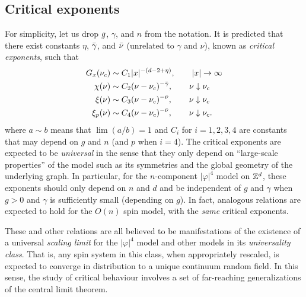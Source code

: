 \subsection{Critical exponents}

For simplicity, let us drop $g$, $\gamma$, and $n$ from the notation.
It is predicted that there exist constants $\eta$, $\bar\gamma$, and $\bar\nu$
(unrelated to $\gamma$ and $\nu$), known as \emph{critical exponents}, such that
\begin{align}
G_x(\nu_c)
	&\sim
C_1 |x|^{-(d - 2 + \eta)},
	\qquad
|x|\rightarrow\infty \\
\chi(\nu)
	&\sim
C_2 (\nu - \nu_c)^{-\bar\gamma},
	\qquad
\nu\downarrow\nu_c \\
\xi(\nu)
	&\sim
C_3 (\nu - \nu_c)^{-\bar\nu},
	\qquad
\nu\downarrow\nu_c \\
\xi_p(\nu)
	&\sim
C_4 (\nu - \nu_c)^{-\bar\nu},
	\qquad
\nu\downarrow\nu_c.
\end{align}
where $a \sim b$ means that $\lim (a/b) = 1$ and $C_i$ for $i = 1,2,3,4$
are constants that may depend on $g$ and $n$ (and $p$ when $i = 4$).
The critical exponents are expected to be \emph{universal} in the sense that they
only depend on ``large-scale properties'' of the model such as its symmetries and
the global geometry of the underlying graph. In particular,
for the $n$-component $|\varphi|^4$ model on ${ {{\mathbb Z}}^d }$, these exponents should only
depend on $n$ and $d$ and be independent of $g$ and $\gamma$ when $g > 0$ and $\gamma$
is sufficiently small (depending on $g$). In fact,
analogous relations are expected to hold for the $O(n)$ spin model, with the
\emph{same} critical exponents.

These and other relations are all believed to be manifestations of the existence of
a universal \emph{scaling limit} for the $|\varphi|^4$ model and other models in its
\emph{universality class}. That is, any spin system in this class, when appropriately
rescaled, is expected to converge in distribution to a unique continuum random field.
In this sense, the study of critical behaviour involves a set of far-reaching
generalizations of the central limit theorem.

